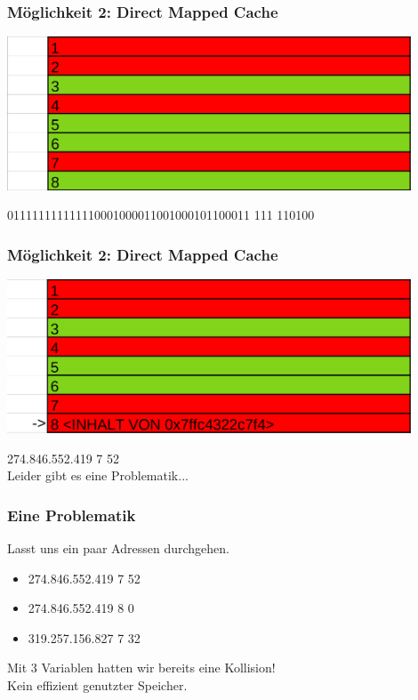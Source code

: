 \documentclass{beamer}
\begin{document}
\begin{frame}
\frametitle{M\"oglichkeit 2: Direct Mapped Cache}
\centerline{\includegraphics[width=12cm]{fac1.png}}
{\color{brown}011111111111110001000011001000101100011} {\color{blue}111} {\color{orange}110100}
\end{frame}

\begin{frame}
\frametitle{M\"oglichkeit 2: Direct Mapped Cache}
\centerline{\includegraphics[width=12cm]{dmc1.png}}
{\color{brown}274.846.552.419} {\color{blue}7} {\color{orange}52}\\
\pause
Leider gibt es eine Problematik...
\end{frame}

%
\begin{frame}
\frametitle{Eine Problematik}
Lasst uns ein paar Adressen durchgehen.
\pause
\begin{itemize}
    \item {\color{brown}274.846.552.419} {\color{blue}7} {\color{orange}52}
    \pause
    \item {\color{brown}274.846.552.419} {\color{blue}8} {\color{orange}0}
    \pause
    \item {\color{brown}319.257.156.827} {\color{blue}7} {\color{orange}32}
    \pause
\end{itemize}
Mit 3 Variablen hatten wir bereits eine Kollision!\\\pause
Kein effizient genutzter Speicher.
\end{frame}
\end{document}
